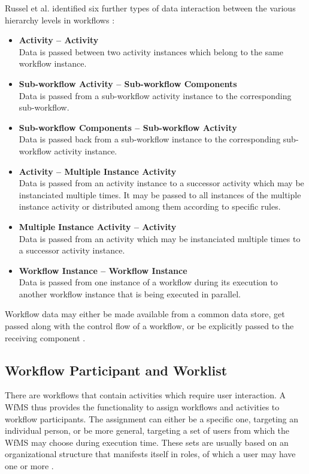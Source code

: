     Russel et al. identified six further types of data interaction between the various hierarchy levels in workflows \cite[p.~16-24]{Russell2005Workflow}:
    \begin{itemize}[nosep]
      \item \textbf{Activity -- Activity} \hfill \\
        Data is passed between two activity instances which belong to the same workflow instance.
      \item \textbf{Sub-workflow Activity -- Sub-workflow Components} \hfill \\
        Data is passed from a sub-workflow activity instance to the corresponding sub-workflow.
      \item \textbf{Sub-workflow Components -- Sub-workflow Activity} \hfill \\
        Data is passed back from a sub-workflow instance to the corresponding sub-workflow activity instance.
      \item \textbf{Activity -- Multiple Instance Activity} \hfill \\
        Data is passed from an activity instance to a successor activity which may be instanciated multiple times. It may be passed to all instances of the multiple instance activity or distributed among them according to specific rules.
      \item \textbf{Multiple Instance Activity -- Activity} \hfill \\
        Data is passed from an activity which may be instanciated multiple times to a successor activity instance.
      \item \textbf{Workflow Instance -- Workflow Instance} \hfill \\
        Data is passed from one instance of a workflow during its execution to another workflow instance that is being executed in parallel.
    \end{itemize}

    Workflow data may either be made available from a common data store, get passed along with the control flow of a workflow, or be explicitly passed to the receiving component \cite[pp.~16-21]{Russell2005Workflow}.

  \subsection{Workflow Participant and Worklist} %
  \label{sub:workflow_participants}
    There are workflows that contain activities which require user interaction. A \ac{WfMS} thus provides the functionality to assign workflows and activities to workflow participants. The assignment can either be a specific one, targeting an individual person, or be more general, targeting a set of users from which the \ac{WfMS} may choose during execution time. These sets are usually based on an organizational structure that manifests itself in roles, of which a user may have one or more \cite{Hollingsworth1995WfMC,Casati1999Specification}.

